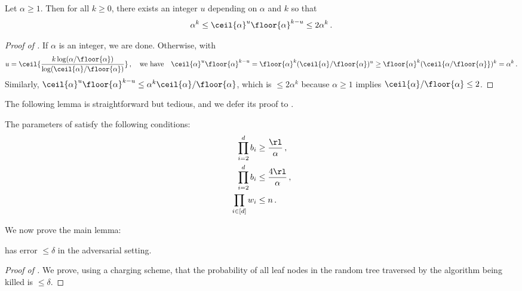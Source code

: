 \begin{itemize}
\begin{itemize}
\begin{lemma}\label{lem:fract-power-round}
  Let $\alpha \ge 1$. Then for all $k \ge 0$, there exists an integer $u$ depending
  on $\alpha$ and $k$ so that 
  \begin{align*}
    \alpha^k \le \ceil{\alpha}^u \floor{\alpha}^{k - u} \le 2 \alpha^k \,.
  \end{align*}
\end{lemma}

\begin{proof}[Proof of ]
  If $\alpha$ is an integer, we are done. Otherwise, with
  \begin{align*}
    u = \ceil{\frac{k \log(\alpha/\floor{\alpha})}{\log(\ceil{\alpha} /\floor{\alpha})}} \,, \quad \text{we have} \quad \ceil{\alpha}^u \floor{\alpha}^{k - u} = \floor{\alpha}^{k} (\ceil{\alpha}/\floor{\alpha})^u \ge \floor{\alpha}^{k} (\ceil{\alpha/\floor{\alpha}})^k = \alpha^k \,.
  \end{align*}
  Similarly, $\ceil{\alpha}^u \floor{\alpha}^{k - u} \le \alpha^k \ceil{\alpha}/\floor{\alpha}$, which is $\le 2\alpha^k$ because $\alpha \ge 1$ implies $\ceil{\alpha}/\floor{\alpha} \le 2$.
\end{proof}

The following lemma is straightforward but tedious, and we defer its proof to  .

\begin{lemma}\label{lem:rt-alg-params}
  The parameters of  satisfy the following conditions:
  \begin{align}
      \prod_{i=2}^{d} b_i &\ge \frac{\rl}{\alpha} \,, \label{eq:rt-ub-param-ge-l} \\
      \prod_{i=2}^{d} b_i &\le \frac{4 \rl}{\alpha} \,, \label{eq:rt-ub-param-le-2l}\\
      \prod_{i \in [d]} w_i &\le n \,. \label{eq:rt-ub-param-le-n}
  \end{align}
\end{lemma}

We now prove the main lemma:

\begin{lemma}\label{lem:rt-ub-error-limit}
   has error $\le \delta$ in the adversarial setting.
\end{lemma}

\begin{proof}[Proof of ]
  We prove, using a charging scheme, that the probability of all leaf nodes
  in the random tree traversed by the algorithm being killed is $\le \delta$.


\end{proof}
\end{itemize}
\end{itemize}
